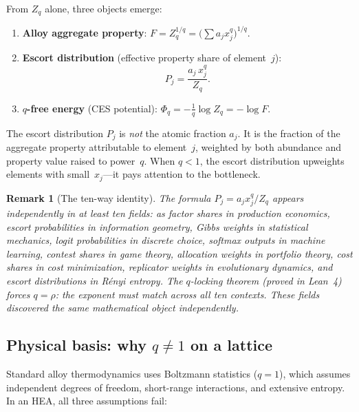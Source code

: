\documentclass[12pt,letterpaper]{article}
\newtheorem{remark}[theorem]{Remark}
\theoremstyle{definition}
\begin{document}
From $Z_q$ alone, three objects emerge:

\begin{enumerate}
  \item \textbf{Alloy aggregate property}: $F = Z_q^{1/q} = \bigl(\sum a_j x_j^q\bigr)^{1/q}$.
  \item \textbf{Escort distribution} (effective property share of element~$j$):
    \begin{equation}\label{eq:escort}
      P_j = \frac{a_j \, x_j^q}{Z_q}.
    \end{equation}
  \item \textbf{$q$-free energy} (CES potential): $\Phi_q = -\tfrac{1}{q} \log Z_q = -\log F$.
\end{enumerate}

The escort distribution $P_j$ is \emph{not} the atomic fraction $a_j$.  It is the fraction of the aggregate property attributable to element~$j$, weighted by both abundance and property value raised to power~$q$.  When $q < 1$, the escort distribution upweights elements with small~$x_j$---it pays attention to the bottleneck.

\begin{remark}[The ten-way identity]
The formula $P_j = a_j x_j^q / Z_q$ appears independently in at least ten fields: as factor shares in production economics, escort probabilities in information geometry, Gibbs weights in statistical mechanics, logit probabilities in discrete choice, softmax outputs in machine learning, contest shares in game theory, allocation weights in portfolio theory, cost shares in cost minimization, replicator weights in evolutionary dynamics, and escort distributions in R\'enyi entropy.  The $q$-locking theorem (proved in Lean~4) forces $q = \rho$: the exponent must match across all ten contexts.  These fields discovered the same mathematical object independently.
\end{remark}

\subsection{Physical basis: why $q \neq 1$ on a lattice}

Standard alloy thermodynamics uses Boltzmann statistics ($q = 1$), which assumes independent degrees of freedom, short-range interactions, and extensive entropy.  In an HEA, all three assumptions fail:
\end{document}
